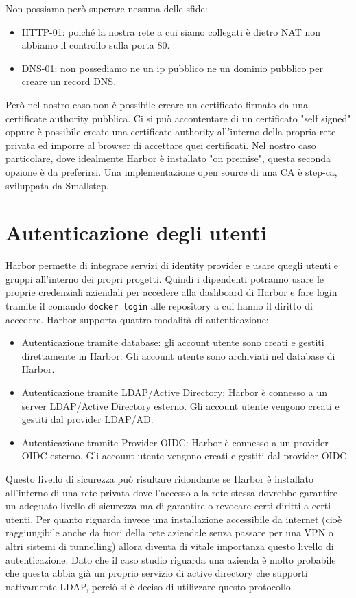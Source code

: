 \documentclass[12pt]{report}
\begin{document}
Non possiamo però superare nessuna delle sfide: 
\begin{itemize}
    \item HTTP-01: poiché la nostra rete a cui siamo collegati è dietro NAT non abbiamo il controllo sulla porta 80.
    \item DNS-01: non possediamo ne un ip pubblico ne un dominio pubblico per creare un record DNS.
\end{itemize}
Però nel nostro caso non è possibile creare un certificato firmato da una certificate authority pubblica.
Ci si può accontentare di un certificato "self signed" oppure è possibile create una certificate authority all'interno della propria rete privata ed imporre al browser di accettare quei certificati. Nel nostro caso particolare, dove idealmente Harbor è installato "on premise", questa seconda opzione è da preferirsi. Una implementazione open source di una CA è step-ca, sviluppata da Smallstep.

\chapter{Autenticazione degli utenti}
Harbor permette di integrare servizi di identity provider e usare quegli utenti e gruppi all'interno dei propri progetti. Quindi i dipendenti potranno usare le proprie credenziali aziendali per accedere alla dashboard di Harbor e fare login tramite il comando \texttt{docker login} alle repository a cui hanno il diritto di accedere. Harbor supporta quattro modalità di autenticazione:
\begin{itemize}
    \item Autenticazione tramite database: gli account utente sono creati e gestiti direttamente in Harbor. Gli account utente sono archiviati nel database di Harbor.
    \item Autenticazione tramite LDAP/Active Directory: Harbor è connesso a un server LDAP/Active Directory esterno. Gli account utente vengono creati e gestiti dal provider LDAP/AD.
    \item Autenticazione tramite Provider OIDC: Harbor è connesso a un provider OIDC esterno. Gli account utente vengono creati e gestiti dal provider OIDC.
\end{itemize}
Questo livello di sicurezza può risultare ridondante se Harbor è installato all'interno di una rete privata dove l'accesso alla rete stessa dovrebbe garantire un adeguato livello di sicurezza ma di garantire o revocare certi diritti a certi utenti. Per quanto riguarda invece una installazione accessibile da internet (cioè raggiungibile anche da fuori della rete aziendale senza passare per una VPN o altri sistemi di tunnelling) allora diventa di vitale importanza questo livello di autenticazione.
Dato che il caso studio riguarda una azienda è molto probabile che questa abbia già un proprio servizio di active directory che supporti nativamente LDAP, perciò si è deciso di utilizzare questo protocollo.
\end{document}
